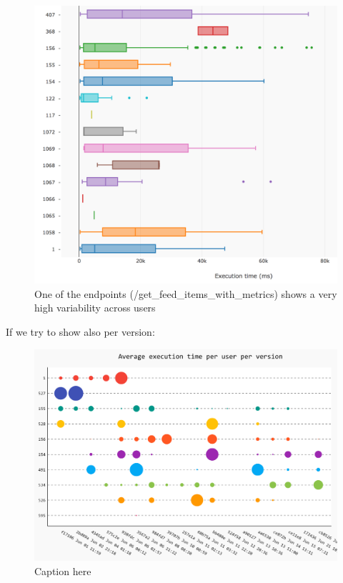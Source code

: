 \documentclass[conference]{IEEEtran}
\begin{document}
  \begin{figure}[h!]
    \centering
    \includegraphics[width=\linewidth]{time_per_user}
    \caption{One of the endpoints (/get\_feed\_items\_with\_metrics) shows a very high variability across users}
    \label{fig:tpu}
  \end{figure}

  If we try to show also per version: 

  \begin{figure}[h!]
    \centering
    \includegraphics[width=\linewidth]{time_per_user_per_version}
    \caption{Caption here}
    \label{fig:figure1}
  \end{figure}
\end{document}
